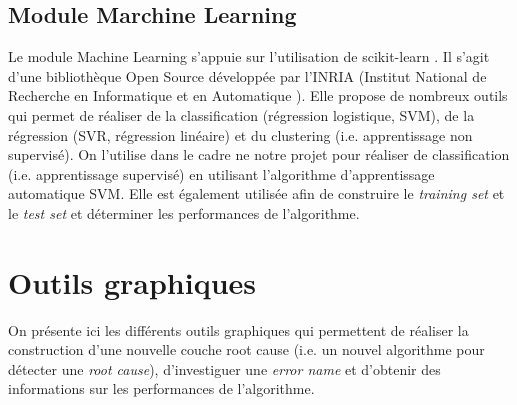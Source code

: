\subsection{Module Marchine Learning}
\label{Industrialisation du produit:  API: Le module Machine Learning}
Le module Machine Learning s'appuie sur l'utilisation de scikit-learn \cite{ScikitLearn}. Il s'agit d'une bibliothèque Open Source développée par l'INRIA (Institut National de Recherche en Informatique et en Automatique \cite{INRIA}). Elle propose de nombreux outils qui permet de réaliser de la classification (régression logistique, SVM), de la régression (SVR, régression linéaire) et du clustering (i.e. apprentissage non supervisé). On l'utilise dans le cadre ne notre projet pour réaliser de classification (i.e. apprentissage supervisé) en utilisant l'algorithme d'apprentissage automatique SVM. Elle est également utilisée afin de construire le \emph{training set} et le \emph{test set} et déterminer les performances de l'algorithme.




\section{Outils graphiques}
\label{Industrialisation du produit: Outils graphiques}
On présente ici les différents outils graphiques qui permettent de réaliser la construction d'une nouvelle couche root cause (i.e. un nouvel algorithme pour détecter une \emph{root cause}), d'investiguer une \emph{error name} et d'obtenir des informations sur les performances de l'algorithme. 

